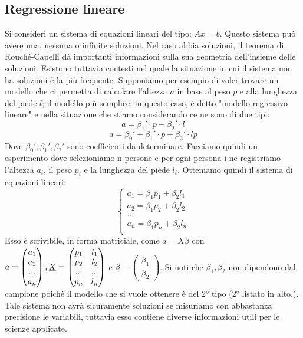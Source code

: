 \documentclass[12pt]{article}
\newenvironment{para}{\begin{adjustwidth}{13mm}{}}{\end{adjustwidth}}
\begin{document}
\begin{para}
\section{Regressione lineare}
Si consideri un sistema di equazioni lineari del tipo: $A\underline{x} = \underline{b}$. Questo sistema può avere una, nessuna o infinite soluzioni. Nel caso abbia soluzioni, il teorema di Rouché-Capelli dà importanti informazioni sulla sua geometria dell'insieme delle soluzioni. Esistono tuttavia contesti nel quale la situazione in cui il sistema non ha soluzioni è la più frequente. Supponiamo per esempio di voler trovare un modello che ci permetta di calcolare l'altezza $a$ in base al peso $p$ e alla lunghezza del piede $l$; il modello più semplice, in questo caso, è detto "modello regressivo lineare" e nella situazione che stiamo considerando ce ne sono di due tipi: $$a = \beta_1'\cdot p + \beta_2' \cdot l$$
$$a = \beta_0'+\beta_1' \cdot p +\beta_2' \cdot l p$$
Dove $\beta_0', \beta_1', \beta_2'$ sono coefficienti da determinare. Facciamo quindi un esperimento dove selezioniamo n persone e per ogni persona i ne registriamo l'altezza $a_i$, il peso $p_i$ e la lunghezza del piede $l_i$. Otteniamo quindi il sistema di equazioni lineari: $$\begin{cases}
    a_1 = \beta_1 p_1 + \beta_2 l_1 \\
    a_2 = \beta_1 p_2 + \beta_2 l_2 \\
    ...\\
    a_n = \beta_1 p_n + \beta_2 l_n \\
\end{cases}$$
Esso è scrivibile, in forma matriciale, come $\underline{a} = \underline{X} \underline{\beta}$ con $a = \begin{pmatrix}
    a_1 \\
    a_2 \\
    ...\\
    a_n
\end{pmatrix}, \newline \underline{X} = \begin{pmatrix}
    p_1 & l_1 \\
    p_2 & l_2 \\
    ... & ...\\
    p_n & l_n
\end{pmatrix}$ e $\underline{\beta} = \begin{pmatrix}
    \beta_1 \\
    \beta_2
\end{pmatrix}$. Si noti che $\beta_1, \beta_2$ non dipendono dal campione poiché il modello che si vuole ottenere è del 2° tipo (2° listato in alto.). Tale sistema non avrà sicuramente soluzioni se misuriamo con abbastanza precisione le variabili, tuttavia esso contiene diverse informazioni utili per le scienze applicate.

\end{para}
\end{document}
